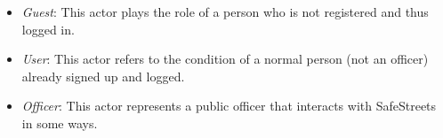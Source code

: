 \begin{itemize}
	\item \textit{Guest}: This actor plays the role of a person who is not registered and thus logged in.
	\item \textit{User}: This actor refers to the condition of a normal person (not an officer) already signed up and logged.
	\item \textit{Officer}: This actor represents a public officer that interacts with SafeStreets in some ways.
\end{itemize}